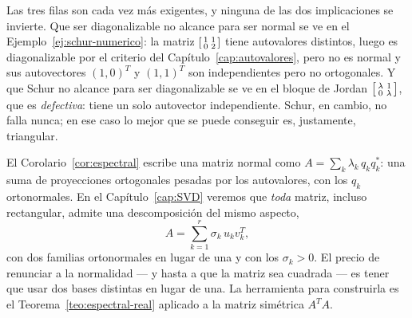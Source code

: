 Las tres filas son cada vez más exigentes, y ninguna de las dos implicaciones se
invierte. Que ser diagonalizable no alcance para ser normal se ve en el
Ejemplo~\ref{ej:schur-numerico}: la matriz
$\begin{bsmallmatrix}1&1\\ 0&2\end{bsmallmatrix}$ tiene autovalores distintos, luego es
diagonalizable por el criterio del Capítulo~\ref{cap:autovalores}, pero no es normal y
sus autovectores $(1,0)^{T}$ y $(1,1)^{T}$ son independientes pero no ortogonales. Y que
Schur no alcance para ser diagonalizable se ve en el bloque de Jordan
$\begin{bsmallmatrix}\lambda&1\\ 0&\lambda\end{bsmallmatrix}$, que es \emph{defectiva}:
tiene un solo autovector independiente. Schur, en cambio, no falla nunca; en ese caso lo
mejor que se puede conseguir es, justamente, triangular.

\begin{remark}
El Corolario~\ref{cor:espectral} escribe una matriz normal como
$A=\sum_k\lambda_k\,q_kq_k^{*}$: una suma de proyecciones ortogonales pesadas por los
autovalores, con los $q_k$ ortonormales. En el Capítulo~\ref{cap:SVD} veremos que
\emph{toda} matriz, incluso rectangular, admite una descomposición del mismo aspecto,
\[
A=\sum_{k=1}^{r}\sigma_k\,u_k v_k^{T},
\]
con dos familias ortonormales en lugar de una y con los $\sigma_k>0$. El precio de
renunciar a la normalidad --- y hasta a que la matriz sea cuadrada --- es tener que usar
dos bases distintas en lugar de una. La herramienta para construirla es el
Teorema~\ref{teo:espectral-real} aplicado a la matriz simétrica $A^{T}A$.
\end{remark}

